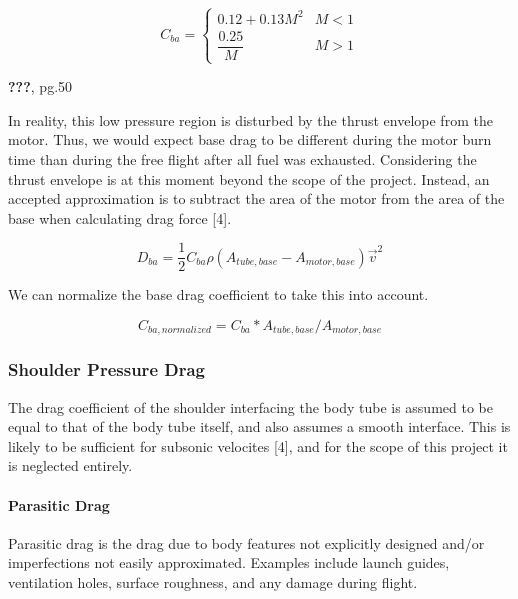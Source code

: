 \documentclass[]{book}
\let\oldparagraph\paragraph
\renewcommand{\paragraph}[1]{\oldparagraph{#1}\mbox{}}
\begin{document}
\begin{equation}
\label{eq_base_drag_coefficient}
C_{ba} = 
\begin{cases}
0.12+0.13 M^2   & M < 1 \\
\dfrac{0.25}{M} & M > 1
\end{cases}
\end{equation}

{\textbf{???}}, pg.50

In reality, this low pressure region is disturbed by the thrust envelope
from the motor. Thus, we would expect base drag to be different during
the motor burn time than during the free flight after all fuel was
exhausted. Considering the thrust envelope is at this moment beyond the
scope of the project. Instead, an accepted approximation is to subtract
the area of the motor from the area of the base when calculating drag
force {[}4{]}.

\begin{equation}
\label{eq_base_drag_force}
D_{ba} = \dfrac{1}{2} C_{ba} \rho (A_{tube,base} - A_{motor,base}) \vec{v}^2 
\end{equation}

We can normalize the base drag coefficient to take this into account.

\begin{equation}
\label{eq_base_drag_coefficient_normalized}
C_{ba,normalized} =
C_{ba} * A_{tube,base}/A_{motor,base}
\end{equation}

\subsubsection{Shoulder Pressure Drag}\label{shoulder-pressure-drag}

The drag coefficient of the shoulder interfacing the body tube is
assumed to be equal to that of the body tube itself, and also assumes a
smooth interface. This is likely to be sufficient for subsonic velocites
{[}4{]}, and for the scope of this project it is neglected entirely.

\paragraph{Parasitic Drag}\label{parasitic-drag}

Parasitic drag is the drag due to body features not explicitly designed
and/or imperfections not easily approximated. Examples include launch
guides, ventilation holes, surface roughness, and any damage during
flight.
\end{document}
